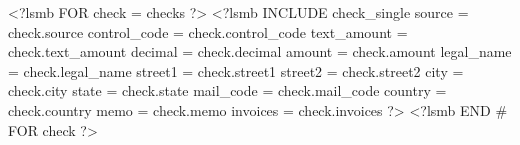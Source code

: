 \documentclass{scrartcl}
\begin{document}
\pagestyle{myheadings}
\thispagestyle{empty}

<?lsmb FOR check = checks ?>
<?lsmb INCLUDE check_single 
	source = check.source
	control_code = check.control_code
	text_amount = check.text_amount
	decimal = check.decimal
	amount = check.amount
	legal_name = check.legal_name
	street1 = check.street1 
	street2 = check.street2 
	city = check.city
	state = check.state
	mail_code = check.mail_code
	country = check.country
	memo = check.memo
	invoices = check.invoices
?>
\clearpage
<?lsmb END # FOR check ?>
\end{document}
